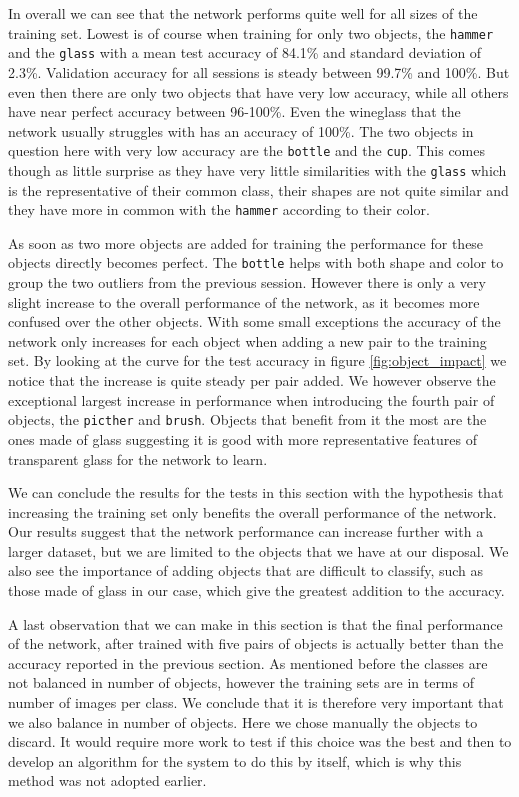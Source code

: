 In overall we can see that the network performs quite well for all sizes of the training set. Lowest is of course when training for only two objects, the \texttt{hammer} and the \texttt{glass} with a mean test accuracy of 84.1\% and standard deviation of 2.3\%. Validation accuracy for all sessions is steady between 99.7\% and 100\%. But even then there are only two objects that have very low accuracy, while all others have near perfect accuracy between 96-100\%. Even the wineglass that the network usually struggles with has an accuracy of 100\%. The two objects in question here with very low accuracy are the \texttt{bottle} and the \texttt{cup}. This comes though as little surprise as they have very little similarities with the \texttt{glass} which is the representative of their common class, their shapes are not quite similar and they have more in common with the \texttt{hammer} according to their color.

As soon as two more objects are added for training the performance for these objects directly becomes perfect. The \texttt{bottle} helps with both shape and color to group the two outliers from the previous session. However there is only a very slight increase to the overall performance of the network, as it becomes more confused over the other objects. With some small exceptions the accuracy of the network only increases for each object when adding a new pair to the training set. By looking at the curve for the test accuracy in figure \ref{fig:object_impact} we notice that the increase is quite steady per pair added. We however observe the exceptional largest increase in performance when introducing the fourth pair of objects, the \texttt{picther} and \texttt{brush}. Objects that benefit from it the most are the ones made of glass suggesting it is good with more representative features of transparent glass for the network to learn.

We can conclude the results for the tests in this section with the hypothesis that increasing the training set only benefits the overall performance of the network. Our results suggest that the network performance can increase further with a larger dataset, but we are limited to the objects that we have at our disposal. We also see the importance of adding objects that are difficult to classify, such as those made of glass in our case, which give the greatest addition to the accuracy.

A last observation that we can make in this section is that the final performance of the network, after trained with five pairs of objects is actually better than the accuracy reported in the previous section. As mentioned before the classes are not balanced in number of objects, however the training sets are in terms of number of images per class. We conclude that it is therefore very important that we also balance in number of objects. Here we chose manually the objects to discard. It would require more work to test if this choice was the best and then to develop an algorithm for the system to do this by itself, which is why this method was not adopted earlier.
